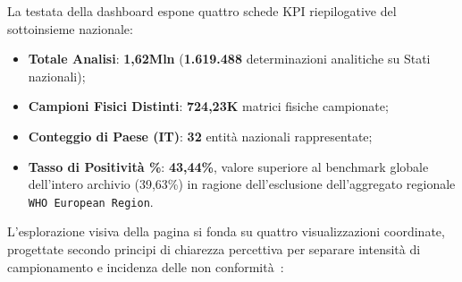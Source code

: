 La testata della dashboard espone quattro schede KPI riepilogative del sottoinsieme nazionale:
\begin{itemize}
    \item \textbf{Totale Analisi}: \textbf{1,62Mln} (\textbf{1.619.488} determinazioni analitiche su Stati nazionali);
    \item \textbf{Campioni Fisici Distinti}: \textbf{724,23K} matrici fisiche campionate;
    \item \textbf{Conteggio di Paese (IT)}: \textbf{32} entità nazionali rappresentate;
    \item \textbf{Tasso di Positività \%}: \textbf{43,44\%}, valore superiore al benchmark globale dell'intero archivio (39,63\%) in ragione dell'esclusione dell'aggregato regionale \texttt{WHO European Region}.
\end{itemize}

L'esplorazione visiva della pagina si fonda su quattro visualizzazioni coordinate, progettate secondo principi di chiarezza percettiva per separare intensità di campionamento e incidenza delle non conformità~\citep{few2013}:

